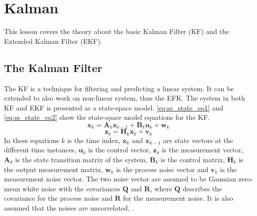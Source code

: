 \documentclass[Main]{subfiles}
\begin{document}
\section{Kalman} %
	\label{sec:kalman}
This lesson covers the theory about the basic Kalman Filter (KF) and the Extended Kalman Filter (EKF).
\subsection{The Kalman Filter}
The KF is a technique for filtering and predicting a linear system. 
It can be extended to also work on non-linear system, thus the EFK. 
The system in both KF and EKF is presented as a state-space model.
\autoref{eq:ss_state_eq1} and \autoref{eq:ss_state_eq2} show the state-space model equations for the KF.
\begin{equation}
\label{eq:ss_state_eq1}
\mathbf{x}_k = \mathbf{A}_k \mathbf{x}_{k-1} + \mathbf{B}_k \mathbf{u}_k + \mathbf{w}_k
\end{equation}
\begin{equation}
\label{eq:ss_state_eq2}
\mathbf{z}_k = \mathbf{H}_k \mathbf{x}_k + \mathbf{v}_k
\end{equation}
In these equations $k$ is the time index, $\mathbf{x}_k$ and $\mathbf{x}_{k-1}$ are state vectors at the different time instances, $\mathbf{u}_k$ is the control vector, $\mathbf{z}_k$ is the measurement vector, $\mathbf{A}_k$ is the state transition matrix of the system, $\mathbf{B}_k$ is the control matrix, $\mathbf{H}_k$ is the output measurement matrix, $\mathbf{w}_k$ is the process noise vector and $\mathbf{v}_k$ is the measurement noise vector.
The two noise vector are assumed to be Gaussian zero-mean white noise with the covariances $\mathbf{Q}$ and $\mathbf{R}$, where $\mathbf{Q}$ describes the covariance for the process noise and $\mathbf{R}$ for the measurement noise. 
It is also assumed that the noises are uncorrelated, \citep{Simon2006}.
\end{document}
